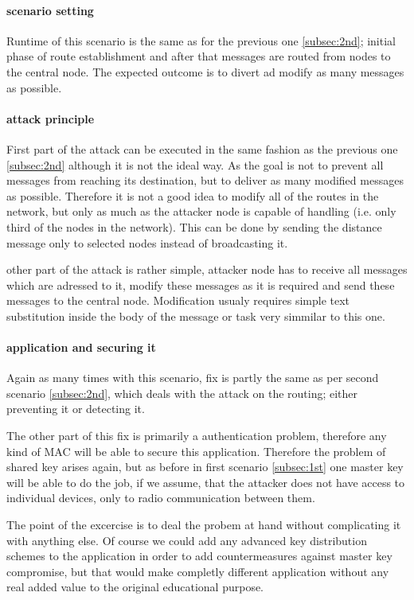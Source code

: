 \documentclass[
  digital, %
  table,   %
  nolof,     %
  nolot,     %
           oneside
]{fithesis3}
\begin{document}
    \paragraph{scenario setting}
    Runtime of this scenario is the same as for the previous one \ref{subsec:2nd}; initial phase of route establishment and after that messages are routed from nodes to the central node. The expected outcome is to divert ad modify as many messages as possible.

    \paragraph{attack principle}
    First part of the attack can be executed in the same fashion as the previous one \ref{subsec:2nd} although it is not the ideal way. As the goal is not to prevent all messages from reaching its destination, but to deliver as many modified messages as possible. Therefore it is not a good idea to modify all of the routes in the network, but only as much as the attacker node is capable of handling (i.e. only third of the nodes in the network). This can be done by sending the distance message only to selected nodes instead of broadcasting it.

    other part of the attack is rather simple, attacker node has to receive all messages which are adressed to it, modify these messages as it is required and send these messages to the central node. Modification usualy requires simple text substitution inside the body of the message or task very simmilar to this one.

    \paragraph{application and securing it}
    Again as many times with this scenario, fix is partly the same as per second scenario \ref{subsec:2nd}, which deals with the attack on the routing; either preventing it or detecting it.

    The other part of this fix is primarily a authentication problem, therefore any kind of MAC will be able to secure this application. Therefore the problem of shared key arises again, but as before in first scenario \ref{subsec:1st} one master key will be able to do the job, if we assume, that the attacker does not have access to individual devices, only to radio communication between them.

    The point of the excercise is to deal the probem at hand without complicating it with anything else. Of course we could add any advanced key distribution schemes  %
    to the application in order to add countermeasures against master key compromise, but that would make completly different application without any real added value to the original educational purpose.
\end{document}
